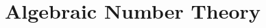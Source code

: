 \documentclass[main.tex]{subfiles}
\begin{document}
	\chapter{Algebraic Number Theory}	
	
	
\end{document}
